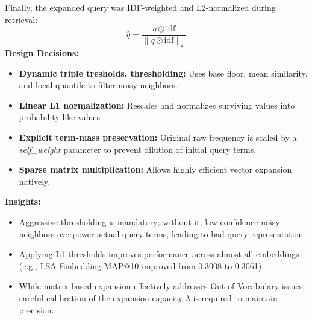 \documentclass[runningheads]{llncs}
\begin{document}
Finally, the expanded query was IDF-weighted and L2-normalized during retrieval:
\begin{equation}
\hat{q} = \frac{q \odot \text{idf}}{\|q \odot \text{idf}\|_2}
\end{equation}
\textbf{Design Decisions:}
\begin{itemize}[noitemsep]
    \item \textbf{Dynamic triple tresholds,  thresholding:} Uses base floor, mean similarity, and local quantile to filter noisy neighbors.
    \item \textbf{Linear L1 normalization:} Rescales and normalizes surviving values into probability like values
    \item \textbf{Explicit term-mass preservation:} Original raw frequency is scaled by a \textit{self\_weight} parameter to prevent dilution of initial query terms.
    \item \textbf{Sparse matrix multiplication:} Allows highly efficient vector expansion natively.
\end{itemize}

\textbf{Insights:}
\begin{itemize}[noitemsep]
    \item Aggressive thresholding is mandatory; without it, low-confidence noisy neighbors overpower actual query terms, leading to bad query representation
    \item Applying L1 thresholds improves performance across almost all embeddings (e.g., LSA Embedding MAP@10 improved from 0.3008 to 0.3061).
    \item While matrix-based expansion effectively addresses Out of Vocabulary issues, careful calibration of the expansion capacity $\lambda$ is required to maintain precision.
\end{itemize}
\end{document}
